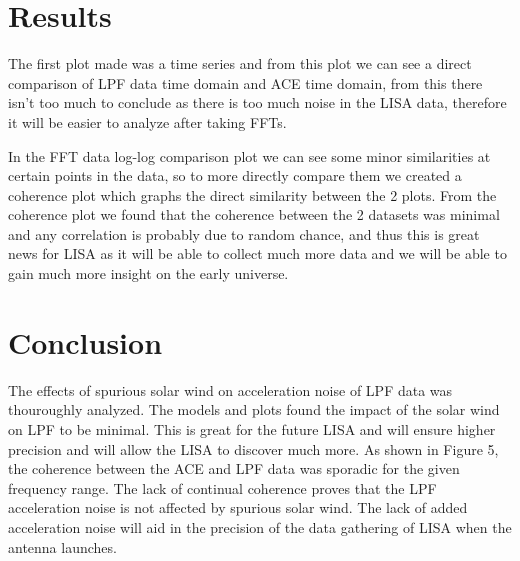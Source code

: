 \documentclass[%
 reprint,
 amsmath,amssymb,
 aps,
]{revtex4-2}
\begin{document}
\section{Results}
The first plot made was a time series and from this plot we can see a direct comparison of LPF data time domain and ACE time domain, from this there isn't too much to conclude as there is too much noise in the LISA data, therefore it will be easier to analyze after taking FFTs.

In the FFT data log-log comparison plot we can see some minor similarities at certain points in the data, so to more directly compare them we created a coherence plot which graphs the direct similarity between the 2 plots. From the coherence plot we found that the coherence between the 2 datasets was minimal and any correlation is probably due to random chance, and thus this is great news for LISA as it will be able to collect much more data and we will be able to gain much more insight on the early universe.

\section{Conclusion}
The effects of spurious solar wind on acceleration noise of LPF data was thouroughly analyzed. The models and plots found the impact of the solar wind on LPF to be minimal. This is great for the future LISA and will ensure higher precision and will allow the LISA to discover much more. As shown in Figure 5, the coherence between the ACE and LPF data was sporadic for the given frequency range. The lack of continual coherence proves that the LPF acceleration noise is not affected by spurious solar wind.  The lack of added acceleration noise will aid in the precision of the data gathering of LISA when the antenna launches.





\cite{stone1998advanced}


\nocite{*}
\end{document}

